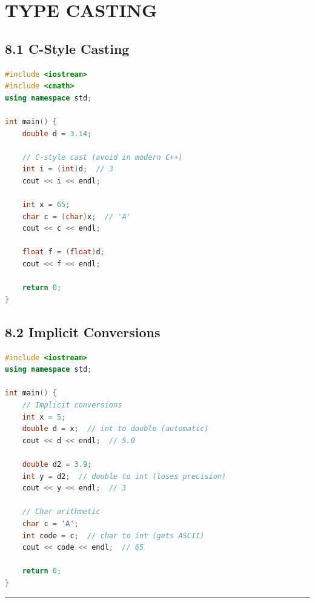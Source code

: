 \hypertarget{type-casting}{%
\chapter{TYPE CASTING}\label{type-casting}}

\hypertarget{c-style-casting}{%
\section{8.1 C-Style Casting}\label{c-style-casting}}

\begin{lstlisting}[language={C++}]
#include <iostream>
#include <cmath>
using namespace std;

int main() {
    double d = 3.14;
    
    // C-style cast (avoid in modern C++)
    int i = (int)d;  // 3
    cout << i << endl;
    
    int x = 65;
    char c = (char)x;  // 'A'
    cout << c << endl;
    
    float f = (float)d;
    cout << f << endl;
    
    return 0;
}
\end{lstlisting}

\hypertarget{implicit-conversions}{%
\section{8.2 Implicit Conversions}\label{implicit-conversions}}

\begin{lstlisting}[language={C++}]
#include <iostream>
using namespace std;

int main() {
    // Implicit conversions
    int x = 5;
    double d = x;  // int to double (automatic)
    cout << d << endl;  // 5.0
    
    double d2 = 3.9;
    int y = d2;  // double to int (loses precision)
    cout << y << endl;  // 3
    
    // Char arithmetic
    char c = 'A';
    int code = c;  // char to int (gets ASCII)
    cout << code << endl;  // 65
    
    return 0;
}
\end{lstlisting}

\begin{center}\rule{0.5\linewidth}{0.5pt}\end{center}
